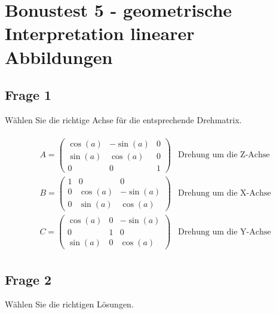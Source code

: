 \chapter{Bonustest 5 - geometrische Interpretation linearer Abbildungen}

\section{Frage 1}

Wählen Sie die richtige Achse für die entsprechende Drehmatrix.

\begin{align*}
    \begin{matrix}
        A = \begin{pmatrix}
                \cos(a) & -\sin(a) & 0 \\
                \sin(a) & \cos(a)  & 0 \\
                0       & 0        & 1
            \end{pmatrix} & \text{Drehung um die Z-Achse} \\
        B = \begin{pmatrix}
                1 & 0       & 0        \\
                0 & \cos(a) & -\sin(a) \\
                0 & \sin(a) & \cos(a)
            \end{pmatrix} & \text{Drehung um die X-Achse} \\
        C = \begin{pmatrix}
                \cos(a) & 0 & -\sin(a) \\
                0       & 1 & 0        \\
                \sin(a) & 0 & \cos(a)
            \end{pmatrix} & \text{Drehung um die Y-Achse}
    \end{matrix}
\end{align*}

\section{Frage 2}

Wählen Sie die richtigen Lösungen.

